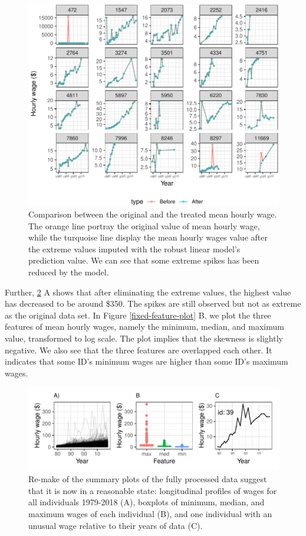 \documentclass{article}
\begin{document}
\begin{figure}

{\centering \includegraphics[width=432px]{figures/compare-plot-1} 

}

\caption{Comparison between the original and the treated mean hourly wage. The orange line portray the original value of mean hourly wage, while the turquoise line display the mean hourly wages value after the extreme values imputed with the robust linear model's prediction value. We can see that some extreme spikes has been reduced by the model.}\label{fig:compare-plot}
\end{figure}

Further, \ref{fig:fixed-feature-plot} A shows that after eliminating the extreme values, the highest value has decreased to be around \$350. The spikes are still observed but not as extreme as the original data set. In Figure \ref{fixed-feature-plot} B, we plot the three features of mean hourly wages, namely the minimum, median, and maximum value, transformed to log scale. The plot implies that the skewness is slightly negative. We also see that the three features are overlapped each other. It indicates that some ID's minimum wages are higher than some ID's maximum wages.

\begin{figure}

{\centering \includegraphics[width=432px]{figures/fixed-feature-plot-1} 

}

\caption{Re-make of the summary plots of the fully processed data suggest that it is now in a reasonable state: longitudinal profiles of wages for all individuals 1979-2018 (A), boxplots of minimum, median, and maximum wages of each individual (B), and one individual with an unusual wage relative to their years of data (C). }\label{fig:fixed-feature-plot}
\end{figure}
\end{document}
